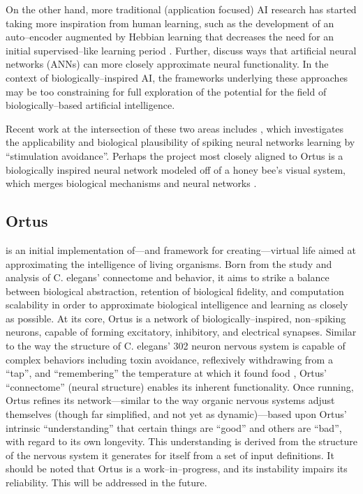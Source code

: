 \documentclass[letterpaper]{article}
\begin{document}
On the other hand, more traditional (application focused) AI research has started taking more inspiration from human learning, such as the development of an auto--encoder augmented by Hebbian learning that decreases the need for an initial supervised--like learning period \citep{Bowren2016}. Further, \citet{Marblestone2016} discuss ways that artificial neural networks (ANNs) can more closely approximate neural functionality.
In the context of biologically--inspired AI, the frameworks underlying these approaches may be too constraining for full exploration of the potential for the field of biologically--based artificial intelligence. 

Recent work at the intersection of these two areas includes \citet{Sinapayen2016}, which investigates the applicability and biological plausibility of spiking neural networks learning by ``stimulation avoidance''. Perhaps the project most closely aligned to Ortus is a biologically inspired neural network modeled off of a honey bee's visual system, which merges biological mechanisms and neural networks \citep{Roper2017}.


\subsection{Ortus} is an initial implementation of---and framework for creating---virtual life aimed at approximating the intelligence of living organisms.
Born from the study and analysis of C. elegans' connectome and behavior, it aims to strike a balance between biological abstraction, retention of biological fidelity, and computation scalability in order to approximate biological intelligence and learning as closely as possible.
At its core, Ortus is a network of biologically--inspired, non--spiking neurons, capable of forming excitatory, inhibitory, and electrical synapses.
Similar to the way the structure of C. elegans' 302 neuron nervous system is capable of complex behaviors including toxin avoidance, reflexively withdrawing from a ``tap'', and ``remembering'' the temperature at which it found food \citep{Jarrell2012}, Ortus' ``connectome'' (neural structure) enables its inherent functionality.
Once running, Ortus refines its network---similar to the way organic nervous systems adjust themselves (though far simplified, and not yet as dynamic)---based upon Ortus' intrinsic ``understanding'' that certain things are ``good'' and others are ``bad'', with regard to its own longevity.
This understanding is derived from the structure of the nervous system it generates for itself from a set of input definitions.
It should be noted that Ortus is a work--in--progress, and its instability impairs its reliability. This will be addressed in the future.
\end{document}
